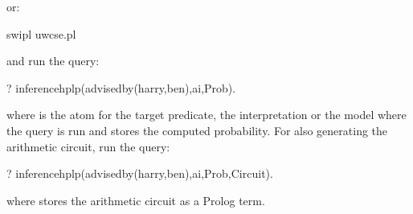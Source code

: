 \documentclass[letterpaper,10pt,english]{sphinxmanual}
\begin{document}
or:

%
\begin{sphinxVerbatim}[commandchars=\\\{\}]
\PYGZdl{} swipl uwcse.pl
\end{sphinxVerbatim}

and run the query:

%
\begin{sphinxVerbatim}[commandchars=\\\{\}]
?\PYGZhy{} inference\PYGZus{}hplp(advisedby(harry,ben),ai,Prob).
\end{sphinxVerbatim}

where  is the atom for the target predicate,  the interpretation or the model where the query is run and  stores the computed probability. For also generating the arithmetic circuit, run the query:

%
\begin{sphinxVerbatim}[commandchars=\\\{\}]
?\PYGZhy{} inference\PYGZus{}hplp(advisedby(harry,ben),ai,Prob,Circuit).
\end{sphinxVerbatim}

where  stores the arithmetic circuit as a Prolog term.
\end{document}
